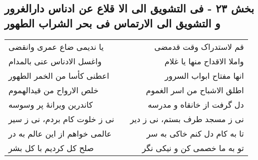 \begin{center}
\section*{بخش ۲۳ - فی التشویق الی الا قلاع عن ادناس دارالغرور و التشویق الی الارتماس فی بحر الشراب الطهور}
\label{sec:023}
\begin{longtable}{l p{0.5cm} r}
یا ندیمی ضاع عمری وانقضی
&&
قم لاستدراک وقت قدمضی
\\
واغسل الادناس عنی بالمدام
&&
واملا الاقداح منها یا غلام
\\
اعطنی کأسا من الخمر الطهور
&&
انها مفتاح ابواب السرور
\\
خلص الارواح من قیدالهموم
&&
اطلق الاشباح من اسر الغموم
\\
کاندرین ویرانهٔ پر وسوسه
&&
دل گرفت از خانقاه و مدرسه
\\
نی ز خلوت کام بردم، نی ز سیر
&&
نی ز مسجد طرف بستم، نی ز دیر
\\
عالمی خواهم از این عالم به در
&&
تا به کام دل کنم خاکی به سر
\\
صلح کل کردیم با کل بشر
&&
تو به ما خصمی کن و نیکی نگر
\\
\end{longtable}
\end{center}
